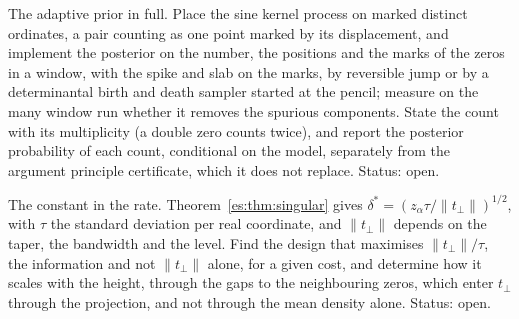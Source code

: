 \begin{problem}\label{es:prob:adaptive_prior}
The adaptive prior in full. Place the sine kernel process on marked distinct ordinates, a pair counting as one point marked by its displacement, and implement the posterior on the number, the positions and the marks of the zeros in a window, with the spike and slab on the marks, by reversible jump or by a determinantal birth and death sampler started at the pencil; measure on the many window run whether it removes the spurious components. State the count with its multiplicity (a double zero counts twice), and report the posterior probability of each count, conditional on the model, separately from the argument principle certificate, which it does not replace. Status: open.
\end{problem}

\begin{problem}\label{es:prob:constant_rate}
The constant in the rate. Theorem~\ref{es:thm:singular} gives $\delta^*=(z_\alpha\tau/\|t_\perp\|)^{1/2}$, with $\tau$ the standard deviation per real coordinate, and $\|t_\perp\|$ depends on the taper, the bandwidth and the level. Find the design that maximises $\|t_\perp\|/\tau$, the information and not $\|t_\perp\|$ alone, for a given cost, and determine how it scales with the height, through the gaps to the neighbouring zeros, which enter $t_\perp$ through the projection, and not through the mean density alone. Status: open.
\end{problem}

